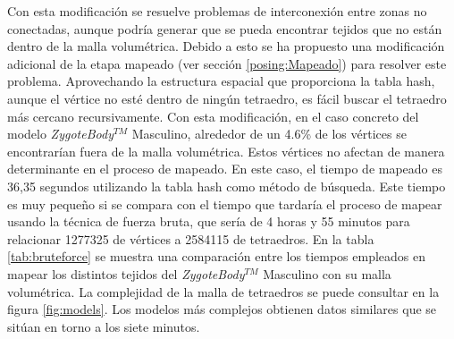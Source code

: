 Con esta modificación se resuelve problemas de interconexión entre zonas no conectadas, aunque podría generar que se pueda encontrar tejidos que no están dentro de la malla volumétrica. %
Debido a esto se ha propuesto una modificación adicional de la etapa mapeado (ver sección \ref{posing:Mapeado}) para resolver este problema. Aprovechando la estructura espacial que proporciona la \ac{tabla hash}, aunque el vértice no esté dentro de ningún tetraedro, es fácil buscar el tetraedro más cercano recursivamente. 
Con esta modificación, en el caso concreto del modelo \emph{ZygoteBody}$^{TM}$ Masculino, alrededor de un 4.6\% de los vértices se encontrarían fuera de la malla volumétrica. 
Estos vértices no afectan de manera determinante en el proceso de mapeado. En este caso, el tiempo de mapeado es 36,35 segundos utilizando la \ac{tabla hash} como método de búsqueda. Este tiempo es muy pequeño si se compara con el tiempo que tardaría el proceso de mapear usando la técnica de fuerza bruta, que sería de 4 horas y 55 minutos para relacionar 1277325 de vértices a 2584115 de tetraedros. %
En la tabla \ref{tab:bruteforce} se muestra una comparación entre los tiempos empleados en mapear los distintos tejidos del \emph{ZygoteBody}$^{TM}$ Masculino con su malla volumétrica. La complejidad de la malla de tetraedros se puede consultar en la figura \ref{fig:models}. Los modelos más complejos obtienen datos similares que se sitúan en torno a los siete minutos.

